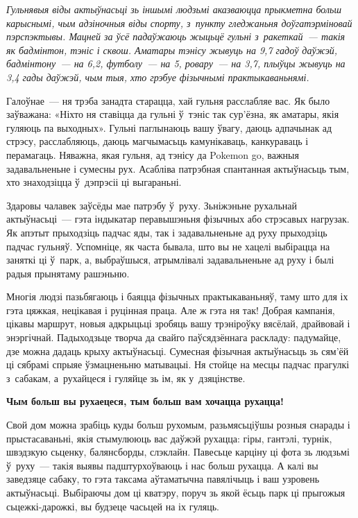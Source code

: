 \emph{Гульнявыя віды актыўнасьці зь іншымі людзьмі аказваюцца прыкметна больш карыснымі, чым адзіночныя віды спорту, з~пункту гледжаньня доўгатэрміновай пэрспэктывы. Мацней за ўсё падаўжаюць жыцьцё гульні з~ракеткай~--- такія як бадмінтон, тэніс і сквош. Аматары тэнісу жывуць на 9,7 гадоў даўжэй, бадмінтону~--- на 6,2, футболу~--- на 5, ровару~--- на 3,7, плыўцы жывуць на 3,4 гады даўжэй, чым тыя, хто грэбуе фізычнымі практыкаваньнямі.}

Галоўнае~--- ня трэба занадта старацца, хай гульня расслабляе вас. Як было заўважана: «Ніхто ня ставіцца да гульні ў~тэніс так сур'ёзна, як аматары, якія гуляюць па выходных». Гульні паглынаюць вашу ўвагу, даюць адпачынак ад стрэсу, расслабляюць, даюць магчымасьць камунікаваць, канкураваць і перамагаць. Няважна, якая гульня, ад тэнісу да Pokemon go, важныя задавальненьне і сумесны рух. Асабліва патрэбная спантанная актыўнасьць тым, хто знаходзіцца ў~дэпрэсіі ці выгараньні. 


Здаровы чалавек заўсёды мае патрэбу ў~руху. Зьніжэньне рухальнай актыўнасьці~--- гэта індыкатар перавышэньня фізычных або стрэсавых нагрузак. Як апэтыт прыходзіць падчас яды, так і задавальненьне ад руху прыходзіць падчас гульняў. Успомніце, як часта бывала, што вы не хацелі выбірацца на заняткі ці ў~парк, а, выбраўшыся, атрымлівалі задавальненьне ад руху і былі радыя прынятаму рашэньню.

 Многія людзі пазьбягаюць і баяцца фізычных практыкаваньняў, таму што для іх гэта цяжкая, нецікавая і руцінная праца. Але ж гэта ня так! Добрая кампанія, цікавы маршрут, новыя адкрыцьці зробяць вашу трэніроўку вясёлай, драйвовай і энэргічнай. Падыходзьце творча да свайго паўсядзённага раскладу: падумайце, дзе можна дадаць крыху актыўнасьці. Сумесная фізычная актыўнасьць зь сям'ёй ці сябрамі спрыяе ўзмацненьню матывацыі. Ня стойце на месцы падчас прагулкі з~сабакам, а~рухайцеся і гуляйце зь ім, як у~дзяцінстве.

\textbf{Чым больш вы рухаецеся, тым больш вам хочацца рухацца!}

Свой дом можна зрабіць куды больш рухомым, разьмясьціўшы розныя снарады і прыстасаваньні, якія стымулююць вас даўжэй рухацца: гіры, гантэлі, турнік, швэдзкую сьценку, балянсборды, слэклайн. Павесьце карціну ці фота зь людзьмі ў~руху~--- такія выявы падштурхоўваюць і нас больш рухацца. А калі вы заведзяце сабаку, то гэта таксама аўтаматычна павялічыць і ваш узровень актыўнасьці. Выбіраючы дом ці кватэру, поруч зь якой ёсьць парк ці прыгожыя сьцежкі-дарожкі, вы будзеце часьцей на іх гуляць.

